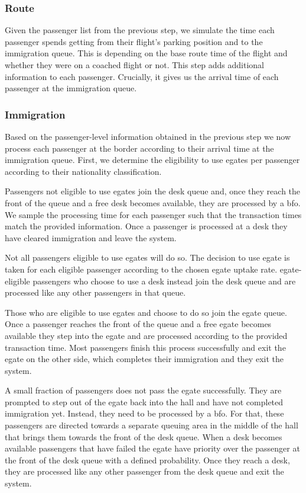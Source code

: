 \documentclass[10pt]{article}
\begin{document}
\subsubsection{Route}

Given the passenger list from the previous step, we simulate the time each passenger spends getting from their flight's parking position and to the immigration queue. This is depending on the base route time 
of the flight and whether they were on a coached flight or not. This step adds additional information to each passenger. Crucially, it gives us the arrival time of each passenger at the immigration queue. 

\subsubsection{Immigration}

Based on the passenger-level information obtained in the previous step we now process each passenger at the border according to their arrival time at the immigration queue. First, we determine the eligibility to use \glspl{egate} per passenger according to their nationality classification. 

Passengers not eligible to use \glspl{egate} join the desk queue and, once they reach the front of the queue and a free desk becomes available, they are processed by a \gls{bfo}. We sample the processing time for each passenger such that the transaction times match the provided information. Once a passenger is processed at a desk they have cleared immigration and leave the system.

Not all passengers eligible to use \glspl{egate} will do so. The decision to use \gls{egate} is taken for each eligible passenger according to the chosen \gls{egate} uptake rate. \gls{egate}-eligible passengers who choose to use a desk instead join the desk queue and are processed like any other passengers in that queue. 

Those who are eligible to use \glspl{egate} and choose to do so join the \gls{egate} queue. Once a passenger reaches the front of the queue and a free \gls{egate} becomes available they step into the \gls{egate} and are processed according to the provided transaction time. Most passengers finish this process successfully and exit the \gls{egate} on the other side, which completes their immigration and they exit the system.

A small fraction of passengers does not pass the \gls{egate} successfully. They are prompted to step out of the \gls{egate} back into the hall and have not completed immigration yet. Instead, they need to be processed by a \gls{bfo}. For that, these passengers are directed towards a separate queuing area in the middle of the hall that brings them towards the front of the desk queue. When a desk becomes available passengers that have failed the \gls{egate} have priority over the passenger at the front of the desk queue with a defined probability. Once they reach a desk, they are processed like any other passenger from the desk queue and exit the system.
\end{document}
